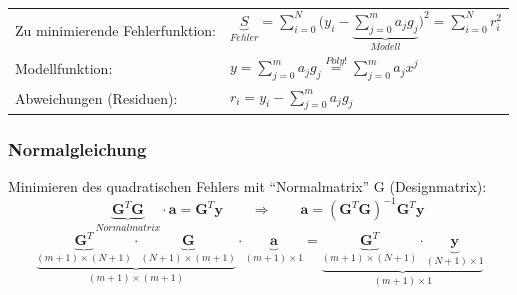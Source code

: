 \begin{minipage}[c]{12.5cm}
	\begin{tabular}{ll}
		Zu minimierende Fehlerfunktion:
		&$\boxed{\underbrace{S}_{Fehler}=\sum\limits_{i=0}^{N}{\big(y_i - \underbrace{\sum\limits_{j=0}^{m}{a_j g_j}}_{Modell}\big)^2} = \sum\limits_{i=0}^{N}{ r_i^2}}$\\
		Modellfunktion: 
		&$\boxed{y=\sum\limits_{j=0}^{m}{a_j g_j}}\overset{Poly!}{=}\sum\limits_{j=0}^{m}{a_j x^j}$\\
		Abweichungen (Residuen): 
		&$r_i=y_i-\sum\limits_{j=0}^{m}{a_j g_j}$
	\end{tabular}
	
	\subsubsection{Normalgleichung}
	
	Minimieren des quadratischen Fehlers mit "`Normalmatrix"' G (Designmatrix):
	$$\underbrace{\bm{G}^T \bm{G}}_{Normalmatrix}\cdot \bm{a} = \bm{G}^T \bm{y} \qquad \Rightarrow \qquad \bm{a}=(\bm{G}^T \bm{G})^{-1}\bm{G}^T \bm{y}$$
	$$\underbrace{\underbrace{\bm{G}^T}_{(m+1)\times(N+1)} \cdot \underbrace{\bm{G}}_{(N+1)\times(m+1)}}_{(m+1)\times(m+1)}\cdot
	  \underbrace{\bm{a}}_{(m+1)\times 1}=
	  \underbrace{\underbrace{\bm{G}^T}_{(m+1)\times(N+1)}\cdot\underbrace{\bm{y}}_{(N+1)\times 1}}_{(m+1)\times 1}$$
\end{minipage}
\hfill
